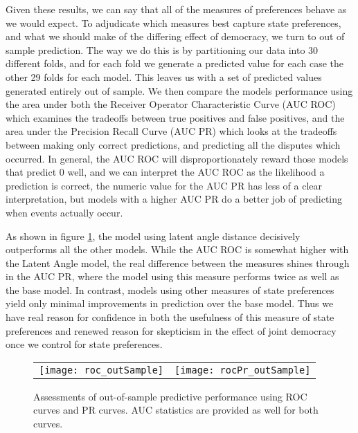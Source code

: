Given these results, we can say that all of the measures of preferences behave as we would expect. To adjudicate which measures best capture state preferences, and what we should make of the differing effect of democracy, we turn to out of sample prediction. The way we do this is by partitioning our data into 30 different folds, and for each fold we generate a predicted value for each case the other 29 folds for each model. This leaves us with a set of predicted values generated entirely out of sample. We then compare the models performance using the area under both the Receiver Operator Characteristic Curve (AUC ROC) which examines the tradeoffs between true positives and false positives, and the area under the Precision Recall Curve (AUC PR) which looks at the tradeoffs between making only correct predictions, and predicting all the disputes which occurred. In general, the AUC ROC will disproportionately reward those models that predict $0$ well, and we can interpret the AUC ROC as the likelihood a prediction is correct, the numeric value for the AUC PR has less of a clear interpretation, but models with a higher AUC PR do a better job of predicting when events actually occur.

As shown in figure \ref{fig:roc}, the model using latent angle distance decisively outperforms all the other models. While the AUC ROC is somewhat higher with the Latent Angle model, the real difference between the measures shines through in the AUC PR, where the model using this measure performs twice as well as the base model. In contrast, models using other measures of state preferences yield only minimal improvements in prediction over the base model. Thus we have real reason for confidence in both the usefulness of this measure of state preferences and renewed reason for skepticism in the effect of joint democracy once we control for state preferences. 

\begin{figure}[ht]
	\centering
	\begin{tabular}{cc}
	\texttt{[image: roc\_outSample]} & 
	\texttt{[image: rocPr\_outSample]}	
	\end{tabular}
	\caption{Assessments of out-of-sample predictive performance using ROC curves and PR curves. AUC statistics are provided as well for both curves.}
	\label{fig:roc}
\end{figure}
\FloatBarrier

